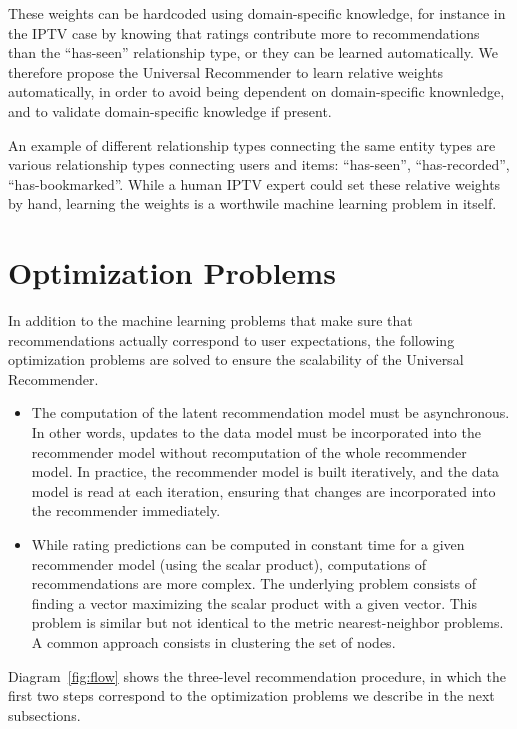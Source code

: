 \documentclass{article}
\begin{document}
These weights can be hardcoded using domain-specific knowledge, for
instance in the IPTV case by knowing that ratings contribute more to
recommendations than the ``has-seen'' relationship type, or they can be learned automatically.
We therefore propose the Universal Recommender to learn relative weights
automatically, in order to avoid being dependent on domain-specific
knownledge, and to validate domain-specific knowledge if present. 

An example of different relationship types connecting the same entity
types are various relationship types connecting users and items:
``has-seen'', ``has-recorded'', ``has-bookmarked''.  While a human IPTV expert could
set these relative weights by hand, learning the weights is a worthwile
machine learning problem in itself. 

\section{Optimization Problems}
In addition to the machine learning problems that make sure that
recommendations actually correspond to user expectations, the following
optimization problems are solved to ensure the scalability of the
Universal Recommender.
\begin{itemize}
\item The computation of the latent recommendation model must be
  asynchronous.  In other words, updates to the data model must be
  incorporated into the recommender model without recomputation of the
  whole recommender model.  In practice, the recommender model is built
  iteratively, and the data model is read at each iteration, ensuring
  that changes are incorporated into the recommender immediately.
\item While rating predictions can be computed in constant time for a
  given recommender model (using the scalar product), computations of
  recommendations are more complex.  The underlying problem consists of
  finding a vector maximizing the scalar product with a given vector.
  This problem is similar but not identical to the metric
  nearest-neighbor problems.  A common approach consists in clustering
  the set of nodes. 
\end{itemize}

Diagram~\ref{fig:flow} shows the three-level recommendation procedure,
in which the first two steps correspond to the optimization problems we
describe in the next subsections. 
\end{document}

